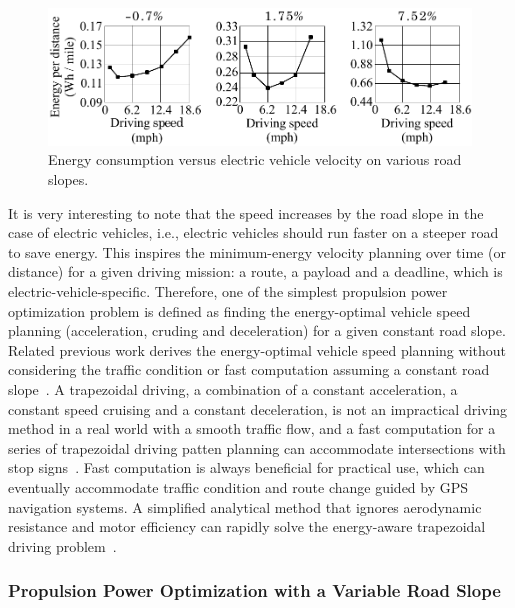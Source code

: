 \begin{figure}
\centering
\includegraphics[width=1.0\hsize]{Figures/Naehyuck_Chang/energy_consumption_by_velocity.pdf}
\caption{Energy consumption versus electric vehicle velocity on various road slopes.}
\label{fig:energy_vs_vel}
\end{figure}      

It is very interesting to note that the speed increases by the road slope in the case of electric vehicles, i.e., electric vehicles should run faster on a steeper road to save energy. This inspires the minimum-energy velocity planning over time (or distance) for a given driving mission: a route, a payload and a deadline, which is electric-vehicle-specific. Therefore, one of the simplest propulsion power optimization problem is defined as finding the energy-optimal vehicle speed planning (acceleration, cruding and deceleration) for a given constant road slope.
Related previous work derives the energy-optimal vehicle speed planning without considering the traffic condition or fast computation assuming a constant road slope~\cite{Yan:NAPS14,Dib:CEP14}. A trapezoidal driving, a combination of a constant acceleration, a constant speed cruising and a constant deceleration, is not an impractical driving method in a real world with a smooth traffic flow, and a fast computation for a series of trapezoidal driving patten planning can accommodate intersections with stop signs~\cite{Yan:NAPS14}. Fast computation is always beneficial for practical use, which can eventually accommodate traffic condition and route change guided by GPS navigation systems. A simplified analytical method that ignores aerodynamic resistance and motor efficiency can rapidly solve the energy-aware trapezoidal driving problem~\cite{Dib:CEP14}.

\subsubsection{Propulsion Power Optimization with a Variable Road Slope} \label{subsubsec:opt_variable_slope}

